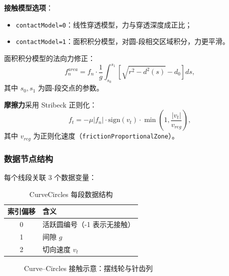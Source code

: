 \documentclass[12pt]{ctexart}
\begin{document}
\textbf{接触模型选项}：
\begin{itemize}
  \item \verb|contactModel=0|：线性穿透模型，力与穿透深度成正比；
  \item \verb|contactModel=1|：面积积分模型，对圆-段相交区域积分，力更平滑。
\end{itemize}

面积积分模型的法向力修正：
\begin{equation}
f_n^{area} = f_n \cdot \frac{1}{g} \int_{s_0}^{s_1} \left[ \sqrt{r^2 - d^2(s)} - d_0 \right] ds,
\end{equation}
其中 $s_0, s_1$ 为圆-段交点的参数。

\textbf{摩擦力}采用 Stribeck 正则化：
\begin{equation}
f_t = -\mu |f_n| \cdot \text{sign}(v_t) \cdot \min\left(1, \frac{|v_t|}{v_{reg}}\right),
\end{equation}
其中 $v_{reg}$ 为正则化速度（\verb|frictionProportionalZone|）。

\subsubsection{数据节点结构}

每个线段关联 3 个数据变量：
\begin{table}[htbp]
\centering
\small
\begin{tabular}{cl}
\toprule
索引偏移 & 含义 \\ 
\midrule
0 & 活跃圆编号（-1 表示无接触） \\ 
1 & 间隙 $g$ \\ 
2 & 切向速度 $v_t$ \\ 
\bottomrule
\end{tabular}
\caption{CurveCircles 每段数据结构}
\end{table}

\begin{figure}[htbp]
\centering
{}
\caption{Curve--Circles 接触示意：摆线轮与针齿列}
\end{figure}
\end{document}
